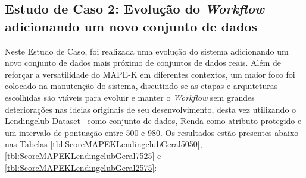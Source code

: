 \documentclass[twocolumn]{article}
\begin{document}
\subsection{Estudo de Caso 2: Evolução do \textit{Workflow} adicionando um novo conjunto de dados}

Neste Estudo de Caso, foi realizada uma evolução do sistema adicionando um novo conjunto de dados mais próximo de conjuntos de dados reais. Além de reforçar a versatilidade do MAPE-K em diferentes contextos, um maior foco foi colocado na manutenção do sistema, discutindo se as etapas e arquiteturas escolhidas são viáveis para evoluir e manter o \textit{Workflow} sem grandes deteriorações nas ideias originais de seu desenvolvimento, desta vez utilizando o Lendingclub Dataset~\citep{lendingclub_2022} como conjunto de dados, Renda como atributo protegido e um intervalo de pontuação entre 500 e 980. Os resultados estão presentes abaixo nas Tabelas \ref{tbl:ScoreMAPEKLendingclubGeral5050}, \ref{tbl:ScoreMAPEKLendingclubGeral7525} e \ref{tbl:ScoreMAPEKLendingclubGeral2575}:

\begin{table}[H]
\begin{center}
  \caption{Melhores opções escolhidas pelo modelo MAPE-K \\ Todos os métodos - 50\% Performance/50\% Fairness}
\label{tbl:ScoreMAPEKLendingclubGeral5050}
\end{center}
\end{table}
\end{document}
